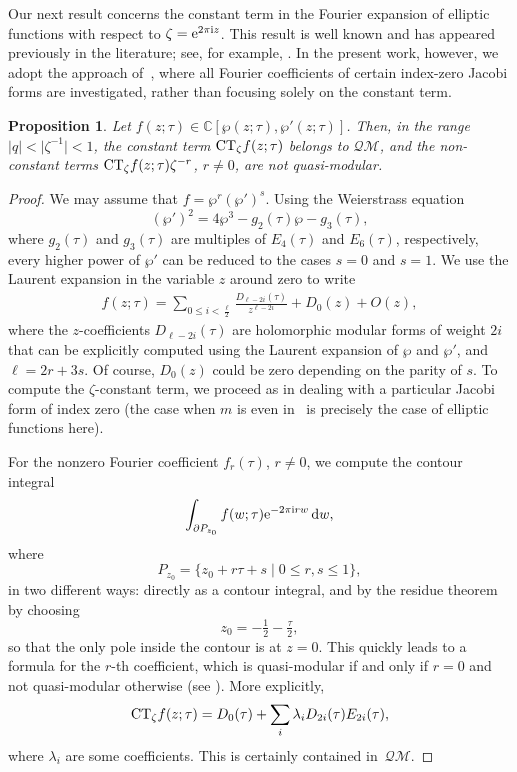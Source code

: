 \documentclass[10pt,a4paper]{amsart}
\numberwithin{equation}{section}
\newtheorem{Proposition}[Theorem]{Proposition}
\theoremstyle{definition}
\begin{document}
Our next result concerns the constant term in the Fourier expansion of elliptic functions with respect to $\zeta = {\rm e}^{2\pi {\rm i} z}$.
This result is well known and has appeared previously in the literature; see, for example, \cite{GM, MP}.
In the present work, however, we adopt the approach of~\cite{BFM}, where all Fourier coefficients of certain index-zero Jacobi forms are investigated, rather than focusing solely on the constant term.
\begin{Proposition} \label{elliptic} Let $f(z;\tau) \in \mathbb{C}[\wp(z;\tau),\wp'(z;\tau)]$.
Then, in the range $ |q|< \bigl|\zeta^{-1}\bigr|<1$, the constant term ${\rm CT}_\zeta f(z;\tau)$ belongs to $\mathcal{QM}$, and the non-constant terms ${\rm CT}_\zeta f(z;\tau)\zeta^{-r}$, $r \neq 0$, are not quasi-modular.
\end{Proposition}
\begin{proof} We may assume that $f=\wp^r (\wp')^s$. Using the Weierstrass equation
\[
(\wp')^2=4\wp^3-g_2(\tau)\wp-g_3(\tau),
\]
where $g_2(\tau)$ and $g_3(\tau)$ are multiples of $E_4(\tau)$ and $E_6(\tau)$, respectively, every higher power of $\wp'$ can be reduced to the cases $s=0$ and $s=1$.
We use the Laurent expansion in the variable $z$ around zero to write
\begin{align*} %
f(z;\tau)=\sum_{0 \leq i < \frac{\ell}{2}} \frac{D_{\ell-2i}(\tau)}{ z^{\ell-2i}}+D_0(z)+O(z),
\end{align*}
where the $z$-coefficients $D_{\ell-2i}(\tau)$ are holomorphic {modular} forms of weight $2i$ that can be explicitly computed using the Laurent expansion of $\wp$
and $\wp'$, and $\ell=2r+3s$. Of course, $D_0(z)$ could be zero depending on the parity of $s$. To compute the $\zeta$-constant term, we proceed as in \cite[Theorem~1.1]{BFM} dealing with a particular Jacobi form of index zero (the case when $m$ is even in~\cite{BFM} is precisely the case of elliptic functions here).

For the nonzero Fourier coefficient $f_r(\tau)$, $r \neq 0$, we compute the contour integral
\[
\int_{\partial P_{z_0}} f(w;\tau) {\rm e}^{-2 \pi {\rm i} r w} \, {\rm d}w,
\]
where
\[
P_{z_0} = \{ z_0 + r \tau + s \mid 0 \leq r,s \leq 1 \},
\]
in two different ways: directly as a contour integral, and by the residue theorem by choosing
\[
z_0 = -\tfrac{1}{2} - \tfrac{\tau}{2},
\]
so that the only pole inside the contour is at $z=0$.
This quickly leads to a formula for the $r$-th coefficient, which is quasi-modular if and only if $r=0$ and not quasi-modular otherwise (see \cite[Theorem~1.1]{BFM}).
More explicitly,
\[
{\rm CT}_\zeta f(z;\tau)=D_0(\tau)+\sum_{i} \lambda_i D_{2i}(\tau)E_{2i}(\tau),
\]
where $\lambda_i$ are some coefficients. This is certainly contained in~$\mathcal{QM}$.
\end{proof}
\end{document}
